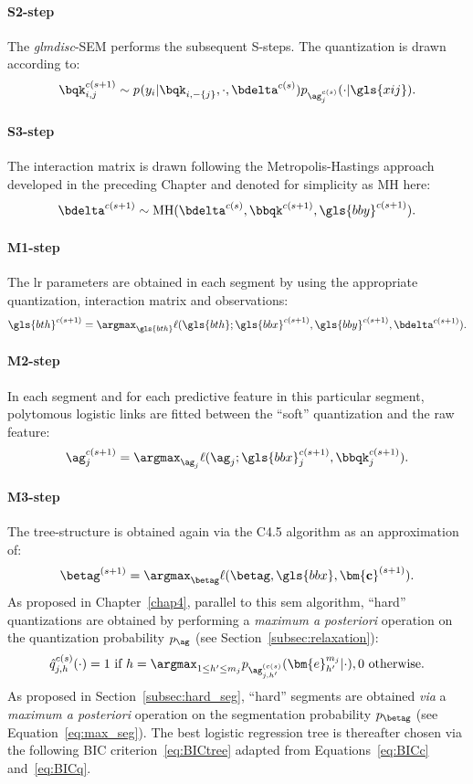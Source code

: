 \paragraph{S2-step} The \textit{glmdisc}-SEM performs the subsequent S-steps. The quantization is drawn according to:
\[ \bqk_{i,j}^{c(s+1)} \sim p_{}(y_i | \bqk_{i,-\{j\}}, \cdot, \bdelta^{c(s)}) p_{\ag_j^{c(s)}}(\cdot | \gls{xij}). \]
\paragraph{S3-step} The interaction matrix is drawn following the Metropolis-Hastings approach developed in the preceding Chapter and denoted for simplicity as MH here:
\[ \bdelta^{c(s+1)} \sim \text{MH}(\bdelta^{c(s)}, \bbqk^{c(s+1)}, \gls{bby}^{c(s+1)}). \]
\paragraph{M1-step} The \gls{lr} parameters are obtained in each segment by using the appropriate quantization, interaction matrix and observations:
\[ \gls{bth}^{c(s+1)} = \argmax_{\gls{bth}} \ell(\gls{bth};\gls{bbx}^{c(s+1)},\gls{bby}^{c(s+1)}, \bdelta^{c(s+1)}). \]
\paragraph{M2-step} In each segment and for each predictive feature in this particular segment, polytomous logistic links are fitted between the ``soft'' quantization and the raw feature:
\[ \ag_j^{c(s+1)} = \argmax_{\ag_j} \ell(\ag_j;\gls{bbx}_j^{c(s+1)},\bbqk_j^{c(s+1)}). \]
\paragraph{M3-step} The tree-structure is obtained again via the C4.5 algorithm as an approximation of:
\[ \betag^{(s+1)} = \argmax_{\betag} \ell(\betag, \gls{bbx}, \mathbf{\bm{c}}^{(s+1)}). \]
As proposed in Chapter~\ref{chap4}, parallel to this \gls{sem} algorithm, ``hard'' quantizations are obtained by performing a \textit{maximum a posteriori} operation on the quantization probability $p_{\ag}$ (see Section~\ref{subsec:relaxation}):
\[ \hat{q}_{j,h}^{c(s)}(\cdot) = 1 \text{ if } h = \argmax_{1 \leq h' \leq m_j} p_{{\ag}_{j,h'}^{(c(s)}}(\bm{e}_{h'}^{m_j} | \cdot), 0 \text{ otherwise.} \]
As proposed in Section~\ref{subsec:hard_seg}, ``hard'' segments are obtained \textit{via} a \textit{maximum a posteriori} operation on the segmentation probability $p_{\betag}$ (see Equation~\eqref{eq:max_seg}). The best logistic regression tree is thereafter chosen via the following BIC criterion~\eqref{eq:BICtree} adapted from Equations~\eqref{eq:BICc} and~\eqref{eq:BICq}.

